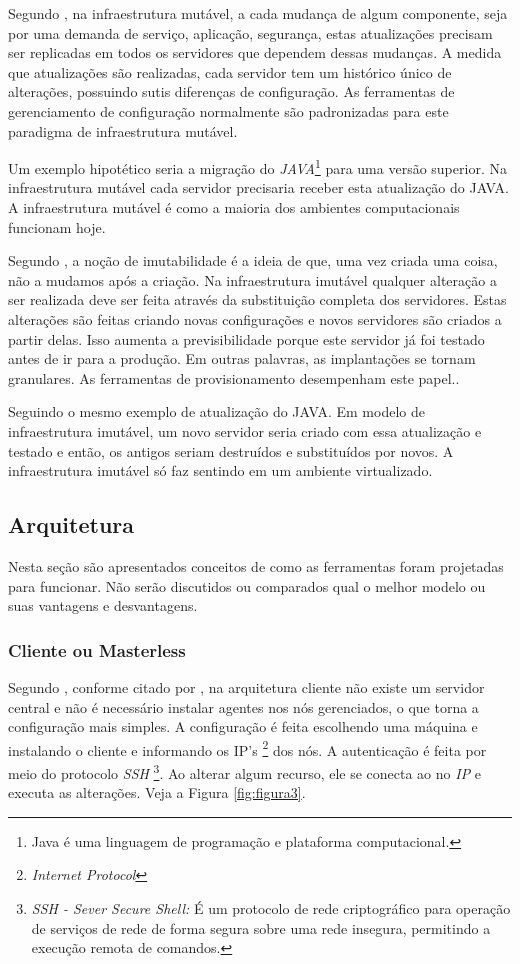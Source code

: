  Segundo , na infraestrutura mutável, a cada mudança de algum componente, seja por uma demanda de serviço, aplicação, segurança, estas atualizações precisam ser replicadas em todos os servidores que dependem dessas mudanças. A medida que atualizações são realizadas, cada servidor tem um histórico único de alterações, possuindo sutis diferenças de configuração. As ferramentas de gerenciamento de configuração normalmente são padronizadas para este paradigma de infraestrutura mutável. 
 
  Um exemplo hipotético seria a migração do \textit{JAVA}\footnote{Java é uma linguagem de programação e plataforma computacional.} para uma versão superior. Na infraestrutura mutável cada servidor precisaria receber esta atualização do JAVA. A infraestrutura mutável é como a maioria dos ambientes computacionais funcionam hoje.
 
 Segundo , a noção de imutabilidade é a ideia de que, uma vez criada uma coisa, não a mudamos após a criação.
 Na infraestrutura imutável qualquer alteração a ser realizada deve ser feita através da substituição completa dos servidores. Estas alterações são feitas criando novas configurações e novos servidores são criados a partir delas. Isso aumenta a previsibilidade porque este servidor já foi testado antes de ir para a produção. Em outras palavras, as implantações se tornam granulares. As ferramentas de provisionamento desempenham este papel.\cite{Morris:2016:ICM:3006361}.
 
 Seguindo o mesmo exemplo de atualização do JAVA. Em modelo de infraestrutura imutável, um novo servidor seria criado com essa atualização e testado e então, os antigos seriam destruídos e substituídos por novos. A infraestrutura imutável só faz sentindo em um ambiente virtualizado. 
 
\subsection{Arquitetura}

Nesta seção são apresentados conceitos de como as ferramentas foram projetadas para funcionar. Não serão discutidos ou comparados qual o melhor modelo ou suas vantagens e desvantagens. 

\subsubsection{Cliente ou Masterless} \label{semagent}
Segundo , conforme citado por , na arquitetura cliente não existe um servidor central e não é necessário instalar agentes nos nós gerenciados, o que torna a configuração mais simples. A configuração é feita escolhendo uma máquina e instalando o cliente e informando os IP's \footnote{\textit{Internet Protocol}} dos nós. A autenticação é feita por meio do protocolo \textit{SSH} \footnote{\textit{SSH - Sever Secure Shell:}  É um protocolo de rede criptográfico para operação de serviços de rede de forma segura sobre uma rede insegura, permitindo a execução remota de comandos.}. Ao alterar algum recurso, ele se conecta ao no \textit{IP} e executa as alterações.  Veja a Figura  \ref{fig:figura3}. 

